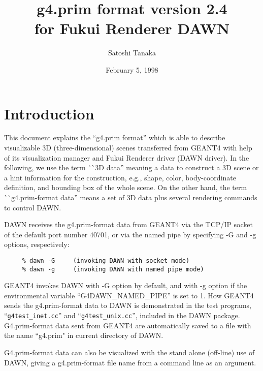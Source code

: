 


\title{g4.prim format version 2.4\\
for Fukui Renderer DAWN}
\author{Satoshi Tanaka}
\date{February 5, 1998}
\maketitle


\section{Introduction}   

This document explains the ``g4.prim format'' which is able to describe  
visualizable 3D (three-dimensional) scenes   
transferred from GEANT4 with help of its visualization manager 
and Fukui Renderer driver (DAWN driver).  
In the following, we use the term ^^ ^^ 3D data'' meaning  
a data to construct a 3D scene or a hint information for the construction,
e.g., shape, color, body-coordinate definition, and bounding box of
the whole scene.
On the other hand, the term ^^ ^^ g4.prim-format data'' means  
a set of 3D data plus several rendering commands to control DAWN.

DAWN receives the g4.prim-format data from GEANT4  
via the TCP/IP socket of the default port number 40701,  
or via the named pipe by specifying -G and -g options, respectively:  

\begin{verbatim}
     % dawn -G     (invoking DAWN with socket mode)
     % dawn -g     (invoking DAWN with named pipe mode)
\end{verbatim}

\noindent
GEANT4 invokes DAWN with -G option by default,  
and with -g option if the environmental variable  
``G4DAWN\_NAMED\_PIPE'' is set to 1.  
How GEANT4 sends the g4.prim-format data to DAWN is demonstrated in 
the test programs, ``\verb+g4test_inet.cc+'' and ``\verb+g4test_unix.cc+'', 
included in the DAWN package.
G4.prim-format data sent from GEANT4 are automatically saved  
to a file with the name ``g4.prim" in current directory of DAWN.   

G4.prim-format data can also be visualized  
with the stand alone (off-line) use of DAWN, giving a g4.prim-format file name  
from a command line as an argument.

